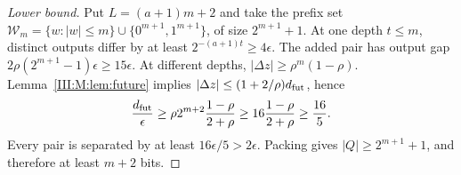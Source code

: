 \begin{proof}[Lower bound]
Put $L=(a+1)m+2$ and take the prefix set
$\mathcal W_m=\{w:|w|\le m\}\cup\{0^{m+1},1^{m+1}\}$,
of size $2^{m+1}+1$. At one depth $t\le m$, distinct outputs differ
by at least $2^{-(a+1)t}\ge4\epsilon$.
The added pair has output gap
$2\rho(2^{m+1}-1)\epsilon\ge15\epsilon$.
At different depths, $|\Delta z|\ge\rho^m(1-\rho)$.
Lemma~\ref{III:M:lem:future} implies
$|\Delta z|\le(1+2/\rho)d_{\rm fut}$, hence
\[
 \frac{d_{\rm fut}}\epsilon\ge
 \rho 2^{m+2}\frac{1-\rho}{2+\rho}
 \ge16\frac{1-\rho}{2+\rho}\ge\frac{16}5.
\]
Every pair is separated by at least $16\epsilon/5>2\epsilon$.
Packing gives $|Q|\ge2^{m+1}+1$, and therefore at least $m+2$ bits.
\end{proof}

